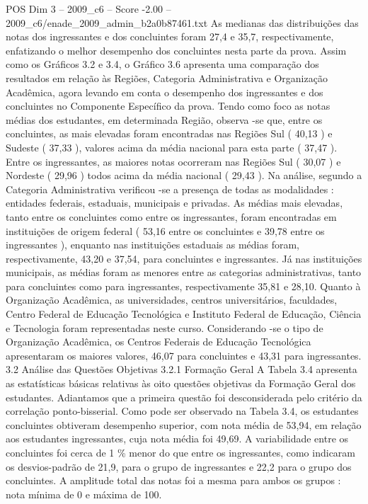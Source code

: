 \begin{textsample}{POS Dim 3 – 2009\_c6 – Score -2.00 – 2009\_c6/enade\_2009\_admin\_b2a0b87461.txt}
As medianas das distribuições das notas dos ingressantes e dos concluintes foram 27,4 e 35,7, respectivamente, enfatizando o melhor desempenho dos concluintes nesta parte da prova.
Assim como os Gráficos 3.2 e 3.4, o Gráfico 3.6 apresenta uma comparação dos resultados em relação às Regiões, Categoria Administrativa e Organização Acadêmica, agora levando em conta o desempenho dos ingressantes e dos concluintes no Componente Específico da prova.
Tendo como foco as notas médias dos estudantes, em determinada Região, observa -se que, entre os concluintes, as mais elevadas foram encontradas nas Regiões Sul ( 40,13 ) e Sudeste ( 37,33 ), valores acima da média nacional para esta parte ( 37,47 ).
Entre os ingressantes, as maiores notas ocorreram nas Regiões Sul ( 30,07 ) e Nordeste ( 29,96 ) todos acima da média nacional ( 29,43 ).
Na análise, segundo a Categoria Administrativa verificou -se a presença de todas as modalidades : entidades federais, estaduais, municipais e privadas.
As médias mais elevadas, tanto entre os concluintes como entre os ingressantes, foram encontradas em instituições de origem federal ( 53,16 entre os concluintes e 39,78 entre os ingressantes ), enquanto nas instituições estaduais as médias foram, respectivamente, 43,20 e 37,54, para concluintes e ingressantes.
Já nas instituições municipais, as médias foram as menores entre as categorias administrativas, tanto para concluintes como para ingressantes, respectivamente 35,81 e 28,10.
Quanto à Organização Acadêmica, as universidades, centros universitários, faculdades, Centro Federal de Educação Tecnológica e Instituto Federal de Educação, Ciência e Tecnologia foram representadas neste curso.
Considerando -se o tipo de Organização Acadêmica, os Centros Federais de Educação Tecnológica apresentaram os maiores valores, 46,07 para concluintes e 43,31 para ingressantes. 3.2 Análise das Questões Objetivas 3.2.1 Formação Geral A Tabela 3.4 apresenta as estatísticas básicas relativas às oito questões objetivas da Formação Geral dos estudantes.
Adiantamos que a primeira questão foi desconsiderada pelo critério da correlação ponto-bisserial.
Como pode ser observado na Tabela 3.4, os estudantes concluintes obtiveram desempenho superior, com nota média de 53,94, em relação aos estudantes ingressantes, cuja nota média foi 49,69.
A variabilidade entre os concluintes foi cerca de 1 \% menor do que entre os ingressantes, como indicaram os desvios-padrão de 21,9, para o grupo de ingressantes e 22,2 para o grupo dos concluintes.
A amplitude total das notas foi a mesma para ambos os grupos : nota mínima de 0 e máxima de 100.

\end{textsample}
